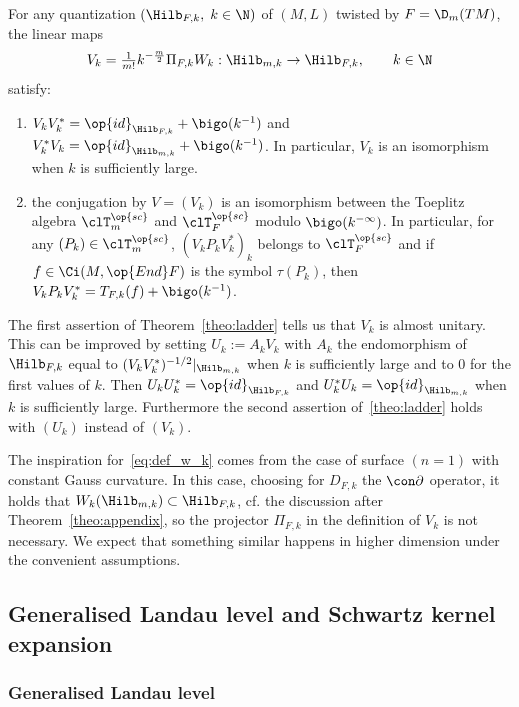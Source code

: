 \begin{theo}\label{theo:ladder}
For any quantization $(\Hilb_{F,k}, \; k \in \N)$ of $(M,L)$
twisted by $F= \D_m (TM)$, the linear maps
\[
V_k = \tfrac{1}{m!} k^{-\frac{m}{2}} \Pi_{F,k} W_k
: \Hilb_{m,k} \rightarrow \Hilb_{F,k}, \qquad k \in \N
\]
satisfy:
\begin{enumerate}
\item $V_kV_k^* = \op{id}_{\Hilb_{F,k}} + \bigo (k^{-1})$ and $V_k^* V_k =\op{id}_{\Hilb_{m,k}} + \bigo (k^{-1})$. In particular, $V_k$ is an isomorphism when $k$ is sufficiently large.
\item the conjugation by $V=(V_k)$ is an isomorphism between the Toeplitz algebra $ \clT^{\op{sc}}_m$ and $\clT_F^{\op{sc}}$ modulo $\bigo (k^{-\infty})$. In particular, for any $(P_k) \in
\clT^{\op{sc}}_m$, $(V_k P_k V_k^*)_k$ belongs to $\clT_F^{\op{sc}}$ and if $f \in \Ci (M, \op{End} F)$ is the symbol $ \tau(P_k)$, then $V_k P_k V_k^* = T_{F,k} (f) + \bigo (k^{-1})$.
\end{enumerate}
\end{theo}

The first assertion of Theorem~\ref{theo:ladder} tells us that $V_k$ is almost unitary. This can be improved by setting $U_k := A_k V_k$ with $A_k$ the endomorphism of $\Hilb_{F,k}$ equal to $(V_kV_k^*)^{-1/2} |_{\Hilb_{m,k}}$ when $k$ is sufficiently large and to $0$ for the first values of $k$. Then $U_k U_k^* = \op{id}_{\Hilb_{F,k}}$ and $U_k^* U_k =
\op{id}_{\Hilb_{m,k}}$ when $k$ is sufficiently large. Furthermore the second assertion of~\ref{theo:ladder} holds with $(U_k)$ instead of $(V_k)$.

 The inspiration for~\eqref{eq:def_w_k} comes from the case of surface $(n =1)$ with constant Gauss curvature. In this case, choosing for $D_{F,k}$ the $
\con\partial$ operator, it holds that $W_k (
\Hilb_{m,k}) \subset \Hilb_{F,k}$, cf. the discussion after Theorem~\ref{theo:appendix}, so the projector $\Pi_{F,k}$ in the definition of $V_k$ is not necessary. We expect that something similar happens in higher dimension under the convenient assumptions. 


\subsection{Generalised Landau level and Schwartz kernel expansion}

\subsubsection{Generalised Landau level}

